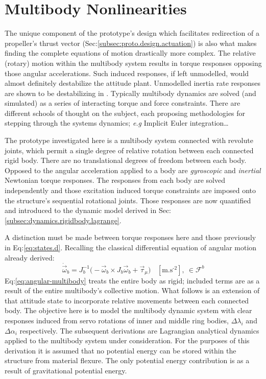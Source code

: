 \section{Multibody Nonlinearities}
\label{sec:dynamics.nonlinearities}
The unique component of the prototype's design which facilitates redirection of a propeller's thrust vector (Sec:\ref{subsec:proto.design.actuation}) is also what makes finding the complete equations of motion drastically more complex. The relative (rotary) motion within the multibody system results in torque responses opposing those angular accelerations. Such induced responses, if left unmodelled, would almost definitely destabilize the attitude plant. Unmodelled inertia rate responses are shown to be destabilizing in \cite{inertiaspin}. Typically multibody dynamics are solved (and simulated) as a series of interacting torque and force constraints. There are different schools of thought on the subject, each proposing methodologies for stepping through the systems dynamics; \emph{e.g} Implicit Euler integration\cite{physicallybased,multibodydynamics}\ldots
\par
The prototype investigated here is a multibody system connected with revolute joints, which permit a single degree of relative rotation between each connected rigid body. There are no translational degrees of freedom between each body. Opposed to the angular acceleration applied to a body are \emph{gyroscopic} and \emph{inertial} Newtonian torque responses. The responses from each body are solved independently and those excitation induced torque constraints are imposed onto the structure's sequential rotational joints. Those responses are now quantified and introduced to the dynamic model derived in Sec:\ref{subsec:dynamics.rigidbody.lagrange}. 
\par
A distinction must be made between torque responses here and those previously in Eq:\ref{eq:states.d}. Recalling the classical differential equation of angular motion already derived:
\begin{equation}\label{eq:angular-multibody}
\dot{\vec{\omega}}_b=J_b^{-1}\big(-\vec{\omega}_b\times J_b\vec{\omega}_b+\vec{\tau}_\mu\big)~~~~[\text{m.s}^{\text{-}2}],~\in\mathcal{F}^b
\end{equation}
Eq:\ref{eq:angular-multibody} treats the entire body as rigid; included terms are as a result of the entire multibody's collective motion. What follows is an extension of that attitude state to incorporate relative movements between each connected body. The objective here is to model the multibody dynamic system with clear responses induced from servo rotations of inner and middle ring bodies, $\Delta\lambda_i$ and $\Delta\alpha_i$ respectively. The subsequent derivations are Lagrangian analytical dynamics applied to the multibody system under consideration. For the purposes of this derivation it is assumed that no potential energy can be stored within the structure from material flexure. The only potential energy contribution is as a result of gravitational potential energy.
